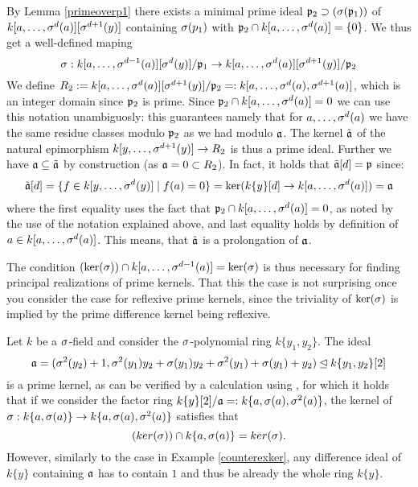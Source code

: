 \begin{prop}
\begin{bew}
By Lemma \ref{primeoverp1} there exists a minimal prime ideal $\mathfrak{p}_2 \supset (\sigma(\mathfrak{p}_1))$ of $k[a,\ldots,\sigma^d(a)][\sigma^{d+1}(y)]$ containing $\sigma(p_1)$ with $\mathfrak{p}_2 \cap k[a,\ldots,\sigma^d(a)] = \{0\}$. 
We thus get a well-defined maping
\[ \sigma: k[a,\ldots,\sigma^{d-1}(a)][\sigma^d(y)]/\mathfrak{p}_1 \rightarrow k[a,\ldots, \sigma^d(a)][\sigma^{d+1}(y)]/\mathfrak{p}_2 \]
We define $R_2:= k[a,\ldots,\sigma^d(a)][\sigma^{d+1}(y)]/\mathfrak{p}_2 =: k[a,\ldots,\sigma^d(a),\sigma^{d+1}(a)]$, which is an integer domain since $\mathfrak{p}_2$ is prime. Since $\mathfrak{p}_2 \cap k[a,\ldots,\sigma^d(a)] = 0$ we can use this notation unambiguosly:
this guarantees namely that for $a, \ldots, \sigma^d(a)$ we have the same residue classes modulo $\mathfrak{p}_2$ as we had modulo $\mathfrak{a}$.
The kernel $\tilde {\mathfrak{a}}$ of the natural epimorphism $k[y,\ldots,\sigma^{d+1}(y)] \rightarrow R_2$ is thus a prime ideal.
Further we have $\mathfrak{a} \subseteq \tilde {\mathfrak{a}}$ by construction (as $\mathfrak{a} = 0 \subset R_2$). In fact, it holds that $\tilde {\mathfrak{a}}[d] = \mathfrak{p}$ since: 
\begin{align*}
\tilde {\mathfrak{a}}[d] = \{ f \in k[y,\ldots,\sigma^d(y)] \mid f(a) = 0 \} = \ker( k\{y\}[d] \rightarrow k[a,\ldots,\sigma^{d}(a)]) = \mathfrak{a}
\end{align*}
where the first equality uses the fact that $\mathfrak{p}_2 \cap k[a,\ldots,\sigma^d(a)] = 0$, as noted by the use of the notation explained above, and last equality holds by definition of $a \in k[a,\ldots,\sigma^d(a)]$. This means, that $\tilde {\mathfrak{a}}$ is a prolongation of $\mathfrak{a}$. 
\end{bew}
\end{prop}

The condition $(\operatorname{ker}(\sigma)) \cap k[a,\ldots,\sigma^{d-1}(a)] = \operatorname{ker}(\sigma)$ is thus necessary for finding principal realizations of prime kernels. 
That this the case is not surprising once you consider the case for reflexive prime kernels, since the triviality of $\operatorname{ker}(\sigma)$ is implied by the prime difference kernel being reflexive.


\begin{ex}\label{secondexamplem2}
Let $k$ be a $\sigma$-field and consider the $\sigma$-polynomial ring $k\{y_1,y_2\}$. 
The ideal $$\mathfrak{a} = (\sigma^2(y_2)+1,\sigma^2(y_1)y_2 + \sigma(y_1)y_2 + \sigma^2(y_1) + \sigma(y_1) + y_2) \unlhd k\{y_1,y_2\}[2]$$ is a prime kernel,
as can be verified by a calculation using \cite{M2}, for which it holds that if we consider the factor ring 
$k\{y\}[2]/\mathfrak{a} =: k\{a,\sigma(a),\sigma^2(a)\}$, the kernel of $\sigma: k\{a,\sigma(a)\} \rightarrow k\{a,\sigma(a),\sigma^2(a)\}$
satisfies that $$(ker(\sigma)) \cap k\{a,\sigma(a)\} = ker(\sigma).$$ However, similarly to the case in Example \ref{counterexker}, any difference ideal of $k\{y\}$ containing 
$\mathfrak{a}$ has to contain $1$ and thus be already the whole ring $k\{y\}$.
\end{ex}

